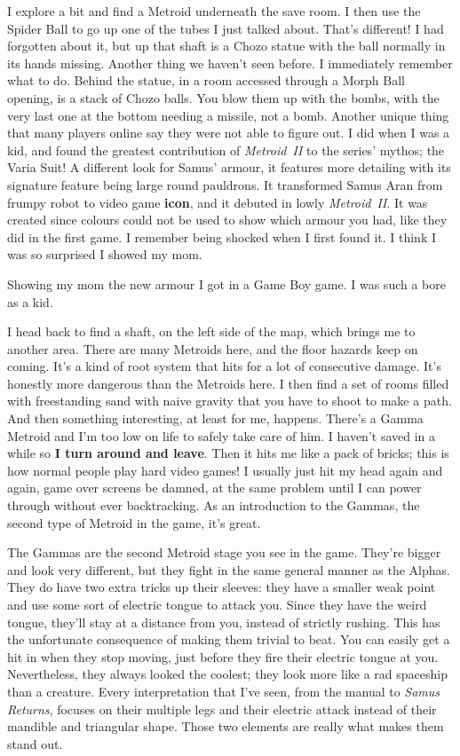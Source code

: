 \documentclass{book}
\begin{document}
I explore a bit and find a Metroid underneath the save room. I then use the Spider Ball to go up one of the tubes I just talked about. That’s different! I had forgotten about it, but up that shaft is a Chozo statue with the ball normally in its hands missing. Another thing we haven’t seen before. I immediately remember what to do. Behind the statue, in a room accessed through a Morph Ball opening, is a stack of Chozo balls. You blow them up with the bombs, with the very last one at the bottom needing a missile, not a bomb. Another unique thing that many players online say they were not able to figure out. I did when I was a kid, and found the greatest contribution of \emph{Metroid II} to the series’ mythos; the Varia Suit! A different look for Samus’ armour, it features more detailing with its signature feature being large round pauldrons. It transformed Samus Aran from frumpy robot to video game \textbf{icon}, and it debuted in lowly \emph{Metroid II}. It was created since colours could not be used to show which armour you had, like they did in the first game. I remember being shocked when I first found it. I think I was so surprised I showed my mom.

Showing my mom the new armour I got in a Game Boy game. I was such a bore as a kid.

I head back to find a shaft, on the left side of the map, which brings me to another area. There are many Metroids here, and the floor hazards keep on coming. It’s a kind of root system that hits for a lot of consecutive damage. It’s honestly more dangerous than the Metroids here. I then find a set of rooms filled with freestanding sand with naive gravity that you have to shoot to make a path. And then something interesting, at least for me, happens. There’s a Gamma Metroid and I’m too low on life to safely take care of him. I haven’t saved in a while so \textbf{I turn around and leave}. Then it hits me like a pack of bricks; this is how normal people play hard video games! I usually just hit my head again and again, game over screens be damned, at the same problem until I can power through without ever backtracking. As an introduction to the Gammas, the second type of Metroid in the game, it’s great.

The Gammas are the second Metroid stage you see in the game. They’re bigger and look very different, but they fight in the same general manner as the Alphas. They do have two extra tricks up their sleeves: they have a smaller weak point and use some sort of electric tongue to attack you. Since they have the weird tongue, they’ll stay at a distance from you, instead of strictly rushing. This has the unfortunate consequence of making them trivial to beat. You can easily get a hit in when they stop moving, just before they fire their electric tongue at you. Nevertheless, they always looked the coolest; they look more like a rad spaceship than a creature. Every interpretation that I’ve seen, from the manual to \emph{Samus Returns}, focuses on their multiple legs and their electric attack instead of their mandible and triangular shape. Those two elements are really what makes them stand out.
\end{document}
